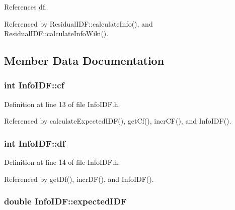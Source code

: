 \-References df.



\-Referenced by \-Residual\-I\-D\-F\-::calculate\-Info(), and \-Residual\-I\-D\-F\-::calculate\-Info\-Wiki().



\subsection{\-Member \-Data \-Documentation}
\hypertarget{classInfoIDF_a73b64360314c93df2622667f71a1b9f3}{
\subsubsection[{cf}]{\setlength{\rightskip}{0pt plus 5cm}int {\bf \-Info\-I\-D\-F\-::cf}}}\label{classInfoIDF_a73b64360314c93df2622667f71a1b9f3}


\-Definition at line 13 of file \-Info\-I\-D\-F.\-h.



\-Referenced by calculate\-Expected\-I\-D\-F(), get\-Cf(), incr\-C\-F(), and \-Info\-I\-D\-F().

\hypertarget{classInfoIDF_aa3e5edea9863b659979314128757dfbb}{
\subsubsection[{df}]{\setlength{\rightskip}{0pt plus 5cm}int {\bf \-Info\-I\-D\-F\-::df}}}\label{classInfoIDF_aa3e5edea9863b659979314128757dfbb}


\-Definition at line 14 of file \-Info\-I\-D\-F.\-h.



\-Referenced by get\-Df(), incr\-D\-F(), and \-Info\-I\-D\-F().

\hypertarget{classInfoIDF_a46e58e37974cf8598229a7e5bdc63e50}{
\subsubsection[{expected\-I\-D\-F}]{\setlength{\rightskip}{0pt plus 5cm}double {\bf \-Info\-I\-D\-F\-::expected\-I\-D\-F}}}\label{classInfoIDF_a46e58e37974cf8598229a7e5bdc63e50}


